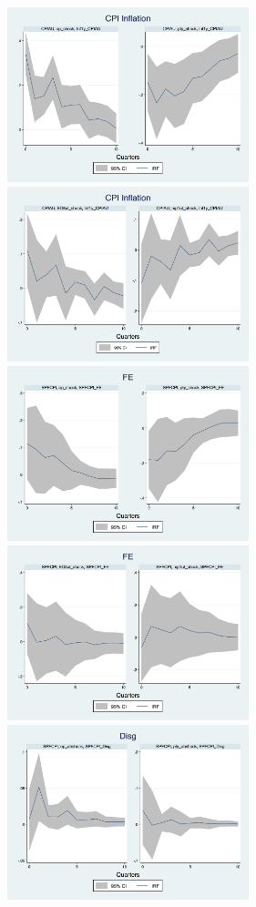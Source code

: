 \documentclass[]{article}
\begin{document}
	\begin{figure}[ht]
		\centering
		\includegraphics[width=7cm,totalheight=3cm]{figures/CPIAU_ashocks_nmp_before2007.png}  
		\includegraphics[width=7cm,totalheight=3cm]{figures/CPIAU_ashocks_before2007.png} \\
		\smallskip
		\includegraphics[width=7cm,totalheight=3cm]{figures/SPFFE_ashocks_nmp_before2007.png} 
		\includegraphics[width=7cm,totalheight=3cm]{figures/SPFFE_ashocks_before2007.png} \\
		\smallskip
		\includegraphics[width=7cm,totalheight=3cm]{figures/SPFDisg_ab_ashocks_nmp_before2007.png} 

\end{figure}
\end{document}
